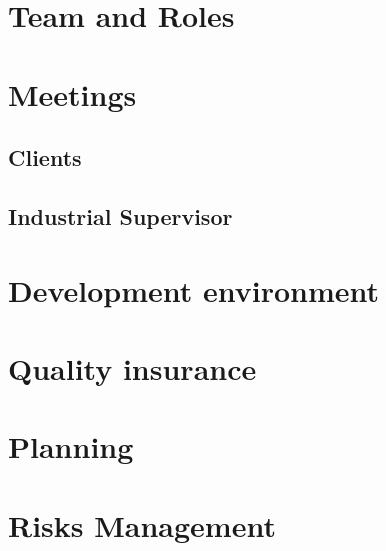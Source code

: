 \section{Team and Roles}
\section{Meetings}
\subsection{Clients}
\subsection{Industrial Supervisor}
\section{Development environment}
\section{Quality insurance}
\section{Planning}
\section{Risks Management}
